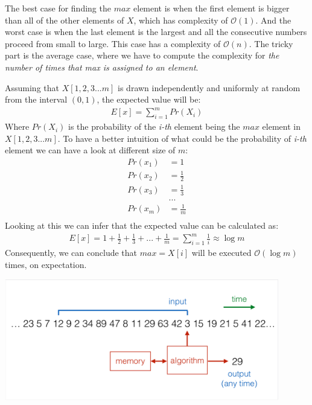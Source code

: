 \documentclass[11pt,a4paper,english]{article}
\begin{document}
\begin{enumerate}
        The best case for finding the $max$ element is when the first element is bigger than all of the other elements of $X$, which has complexity of $\mathcal{O}(1)$. And the worst case is when the last element is the largest and all the consecutive numbers proceed from small to large. This case has a complexity of $\mathcal{O}(n)$. The tricky part is the average case, where we have to compute the complexity for \textit{the number of times that max is assigned to an element}.

        Assuming that $X[1,2,3...m]$ is drawn independently and uniformly at random from the interval $(0,1)$, the expected value will be:
        \begin{align*}
          E[x] = \sum\limits_{i=1}^{m} Pr(X_i)
        \end{align*}
        Where $Pr(X_i)$ is the probability of the \textit{i-th} element being the $max$ element in $X[1,2,3...m]$. To have a better intuition of what could be the probability of \textit{i-th} element we can have a look at different size of $m$:
        \begin{align*}
          Pr(x_1) & = 1 \\
          Pr(x_2) & = \frac{1}{2} \\
          Pr(x_3) & = \frac{1}{3} \\
                  & ... \\
          Pr(x_m) & = \frac{1}{m} \\
        \end{align*}
        Looking at this we can infer that the expected value can be calculated as:
        \begin{align*}
          E[x] = 1 + \frac{1}{2} + \frac{1}{3} + ... + \frac{1}{m} = \sum\limits_{i=1}^{m}{\frac{1}{i}} \approx \log{m}
        \end{align*}
        Consequently, we can conclude that $max = X[i]$ will be executed $\mathcal{O}(\log m)$ times, on expectation.

        \begin{center}
          \includegraphics[width=12cm]{1_sliding_window.png}
        \end{center}


\end{enumerate}
\end{document}
